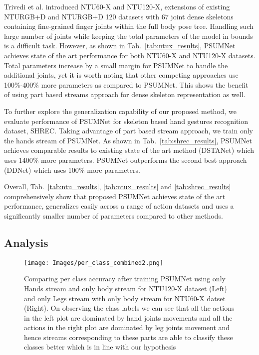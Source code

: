 \documentclass[runningheads]{llncs}
\begin{document}
Trivedi et al.\cite{trivedi2021ntux} introduced NTU60-X and NTU120-X, extensions of existing NTURGB+D and NTURGB+D 120 datasets with 67 joint dense skeletons containing fine-grained finger joints within the full body pose tree. Handling such large number of joints while keeping the total parameters of the model in bounds is a difficult task. However, as shown in Tab.~\ref{tab:ntux_results}, PSUMNet achieves state of the art performance for both NTU60-X and NTU120-X datasets. Total parameters increase by a small margin for PSUMNet to handle the additional joints, yet it is worth noting that other competing approaches use 100\%-400\% more parameters as compared to PSUMNet. This shows the benefit of using part based streams approach for dense skeleton representation as well.




To further explore the generalization capability of our proposed method, we evaluate performance of PSUMNet for skeleton based hand gestures recognition dataset, SHREC\cite{de20173d}. Taking advantage of part based stream approach, we  train only the hands stream of PSUMNet. As shown in Tab.~\ref{tab:shrec_results}, PSUMNet achieves comparable results to existing state of the art method (DSTANet\cite{dstanet_accv2020}) which uses 1400\% more parameters. PSUMNet  outperforms the second best approach (DDNet\cite{yang2019make}) which uses 100\% more parameters.


Overall, Tab.~\ref{tab:ntu_results}, \ref{tab:ntux_results} and \ref{tab:shrec_results} comprehensively show that proposed PSUMNet achieves state of the art performance, generalizes easily across a range of action datasets and uses a significantly smaller number of parameters compared to other methods.

\subsection{Analysis}
\label{sec:discussion}

\begin{figure*}[!t]
  \centering
  \texttt{[image: Images/per\_class\_combined2.png]}
  \caption{Comparing per class accuracy after training PSUMNet using only Hands stream and only body stream for NTU120-X dataset (Left) and only Legs stream with only body stream for NTU60-X datset (Right). On observing the class labels we can see that all the actions in the left plot are dominated by hand joints movements and all the actions in the right plot are dominated by leg joints movement and hence streams corresponding to these parts are able to classify these classes better which is in line with our hypothesis}
  \label{fig:hands_body_120x}
\end{figure*}
\end{document}
